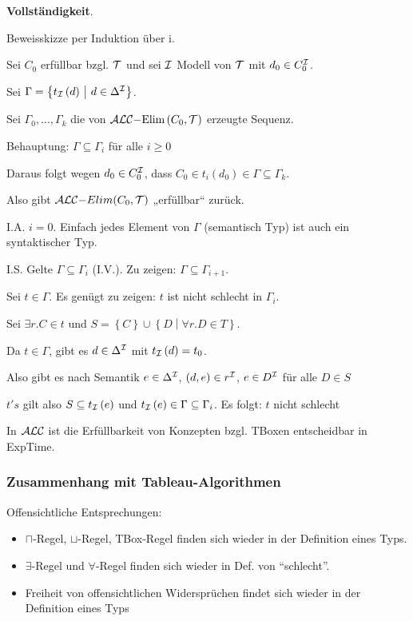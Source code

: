 \textbf{Vollständigkeit}. 

Beweisskizze per Induktion über i.

Sei $C_{0}$ erfüllbar bzgl. $\mathcal{T}$ und sei $\mathcal{I}$ Modell von $\mathcal{T}$ mit
$d_{0} \in C_{0}^{\mathcal{I}}$. 

Sei $\Gamma = \left\{ t_{\mathcal{I}}\left( d \right)\  \middle| \ d \in \Delta^{\mathcal{I}} \right\}$.

Sei $\Gamma_{0},\ldots,\Gamma_{k}$ die von $\text {$\mathcal{A}\mathcal{L}\mathcal{C}$}\mathrm{-}\text{Elim}\left( C_{0},\mathcal{T} \right)$ erzeugte Sequenz. 

Behauptung: $\Gamma \subseteq \Gamma_{i}$ für alle $i \geq 0$

Daraus folgt wegen $d_{0} \in C_{0}^{\mathcal{I}}$, dass $C_{0} \in t_{i}\left( d_{0} \right) \in \Gamma \subseteq \Gamma_{k}$.

Also gibt $\text {$\mathcal{A}\mathcal{L}\mathcal{C}$}\mathrm{-}Elim(C_{0},\mathcal{T})$ „erfüllbar`` zurück.

I.A. $i = 0$. Einfach jedes Element von $\Gamma$ (semantisch Typ)
ist auch ein syntaktischer Typ.

I.S. Gelte $\Gamma \subseteq \Gamma_{i}$ (I.V.). Zu zeigen:
$\Gamma \subseteq \Gamma_{i + 1}$. 

Sei $t \in \Gamma$. Es genügt zu zeigen: $t$ ist nicht schlecht in $\Gamma_{i}$. 

Sei $\exists r.C \in t$ und $S = \left\{ C \right\} \cup \left\{ D \middle| \forall r.D \in T \right\}$.

Da $t \in \Gamma$, gibt es $d \in \Delta^{\mathcal{I}}$ mit $t_{\mathcal{I}}\left( d \right) = t_{0}$. 

Also gibt es nach Semantik $e \in \Delta^{\mathcal{I}}$, $\left( d,e \right) \in r^{\mathcal{I}}$, $e \in D^{\mathcal{I}}$ für alle $D \in S$

$t's$ gilt also $S \subseteq t_{\mathcal{I}}\left( e \right)$ und $t_{\mathcal{I}}\left( e \right) \in \Gamma \subseteq \Gamma_{i}$. Es folgt:
$t$ nicht schlecht

\begin{theorem}
In $\mathcal{A}\mathcal{L}\mathcal{C}$ ist die Erfüllbarkeit von Konzepten bzgl. TBoxen entscheidbar in ExpTime.
\end{theorem}

\subsubsection{Zusammenhang mit Tableau-Algorithmen}

Offensichtliche Entsprechungen:

\begin{itemize}
  \item $\sqcap$-Regel, $\sqcup$-Regel, TBox-Regel finden sich wieder in der Definition eines Typs.
  \item $\exists$-Regel und $\forall$-Regel finden sich wieder in Def. von ``schlecht''.
  \item Freiheit von offensichtlichen Widersprüchen findet sich wieder in der Definition eines Typs
\end{itemize}


